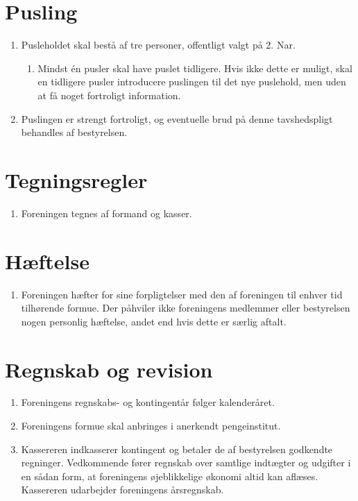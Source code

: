 \documentclass[a4paper, 10pt]{article}
\renewcommand\thesection{\textsection\arabic{section}}
\newenvironment{stykenum}{
  \begin{enumerate}[%
    label=Stk.~\arabic*:, ref=\textsection~\theenumi~Stk.~\arabic*, start=1]
}{\end{enumerate}}
\newenvironment{substykenum}{
  \begin{enumerate}[%
          label=Stk.~\arabic{enumi}.\arabic*:,
      ref=\thesection~Stk.~\arabic{enumi}.\arabic*, start=1]
}{\end{enumerate}}
\begin{document}
\section{Pusling}
\begin{stykenum}
    \item Pusleholdet skal bestå af tre personer, offentligt valgt på 2. Nar.
        \begin{substykenum}
            \item Mindst én pusler skal have puslet tidligere. Hvis ikke dette
                er muligt, skal en tidligere pusler introducere puslingen til
                det nye puslehold, men uden at få noget fortroligt information.
        \end{substykenum}
    \item Puslingen er strengt fortroligt, og eventuelle brud på denne
        tavshedspligt behandles af bestyrelsen.
\end{stykenum}

\section{Tegningsregler}
\begin{stykenum}
    \item Foreningen tegnes af formand og kasser.
\end{stykenum}

\section{Hæftelse}
\begin{stykenum}
    \item Foreningen hæfter for sine forpligtelser med den af foreningen til
        enhver tid tilhørende formue. Der påhviler ikke foreningens medlemmer
        eller bestyrelsen nogen personlig hæftelse, andet end hvis dette er
        særlig aftalt.
\end{stykenum}

\section{Regnskab og revision}
\begin{stykenum}
    \item Foreningens regnskabs- og kontingentår følger kalenderåret.

    \item Foreningens formue skal anbringes i anerkendt pengeinstitut.

    \item Kassereren indkasserer kontingent og betaler de af bestyrelsen
        godkendte regninger. Vedkommende fører regnskab over samtlige indtægter
        og udgifter i en sådan form, at foreningens øjeblikkelige økonomi altid
        kan aflæses. Kassereren udarbejder foreningens årsregnskab.
\end{stykenum}
\end{document}
